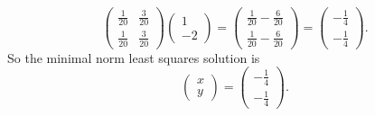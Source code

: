 \documentclass[10pt]{extarticle}
\begin{document}
\begin{enumerate}[label=(\alph*)]
\[\begin{pmatrix}
\frac{1}{20} & \frac{3}{20}\\[0.4em]
\frac{1}{20} & \frac{3}{20}
\end{pmatrix}
\begin{pmatrix}
1\\-2
\end{pmatrix}
=
\begin{pmatrix}
\frac{1}{20}-\frac{6}{20}\\[0.4em]
\frac{1}{20}-\frac{6}{20}
\end{pmatrix}
=
\begin{pmatrix}
-\frac{1}{4}\\[0.4em]
-\frac{1}{4}
\end{pmatrix}.
\]
So the minimal norm least squares solution is
\[
\boxed{\begin{pmatrix}x\\y\end{pmatrix}=
\begin{pmatrix}
-\frac{1}{4}\\[0.4em]
-\frac{1}{4}
\end{pmatrix}.}
\]


\end{enumerate}
\end{document}
